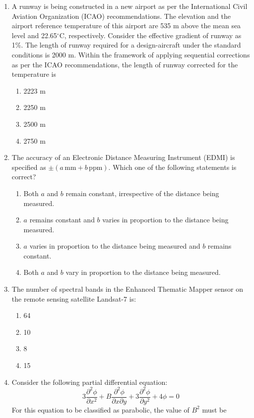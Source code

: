 \documentclass[article]{IEEEtran}
\numberwithin{figure}{enumi}
\begin{document}
\begin{enumerate}
\item A runway is being constructed in a new airport as per the International Civil Aviation Organization (ICAO) recommendations. The elevation and the airport reference temperature of this airport are 535 m above the mean sea level and 22.65$^\circ$C, respectively. Consider the effective gradient of runway as 1\%. The length of runway required for a design-aircraft under the standard conditions is 2000 m. Within the framework of applying sequential corrections as per the ICAO recommendations, the length of runway corrected for the temperature is
    \begin{enumerate}
        \item 2223 m
        \item 2250 m
        \item 2500 m
        \item 2750 m
    \end{enumerate}

\item The accuracy of an Electronic Distance Measuring Instrument (EDMI) is specified as $\pm (a \, \text{mm} + b \, \text{ppm})$. Which one of the following statements is correct?
    \begin{enumerate}
        \item Both $a$ and $b$ remain constant, irrespective of the distance being measured.
        \item $a$ remains constant and $b$ varies in proportion to the distance being measured.
        \item $a$ varies in proportion to the distance being measured and $b$ remains constant.
        \item Both $a$ and $b$ vary in proportion to the distance being measured.
    \end{enumerate}

\item The number of spectral bands in the Enhanced Thematic Mapper sensor on the remote sensing satellite Landsat-7 is:

\begin{enumerate}[label=(\Alph*)]
    \item 64
    \item 10
    \item 8
    \item 15
\end{enumerate}



\item Consider the following partial differential equation:
\[
3 \frac{\partial^2 \phi}{\partial x^2} + B \frac{\partial^2 \phi}{\partial x \partial y} + 3 \frac{\partial^2 \phi}{\partial y^2} + 4 \phi = 0
\]
For this equation to be classified as parabolic, the value of \( B^2 \) must be \underline{\hspace{2cm}}



\end{enumerate}
\end{document}
